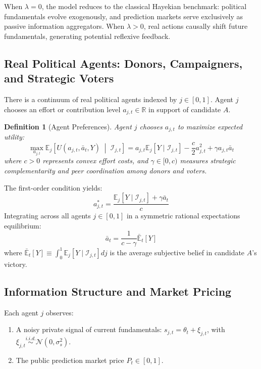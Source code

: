 \documentclass[12pt]{article}
\newtheorem{definition}{Definition}
\begin{document}
When $\lambda = 0$, the model reduces to the classical Hayekian benchmark: political fundamentals evolve exogenously, and prediction markets serve exclusively as passive information aggregators. When $\lambda > 0$, real actions causally shift future fundamentals, generating potential reflexive feedback.

\subsection{Real Political Agents: Donors, Campaigners, and Strategic Voters}
There is a continuum of real political agents indexed by $j \in [0, 1]$. Agent $j$ chooses an effort or contribution level $a_{j,t} \in \mathbb{R}$ in support of candidate $A$.

\begin{definition}[Agent Preferences]
Agent $j$ chooses $a_{j,t}$ to maximize expected utility:
\begin{equation}
\max_{a_{j,t}} \mathbb{E}_j \left[ U(a_{j,t}, \bar{a}_t, Y) \;\middle|\; \mathcal{I}_{j,t} \right] = a_{j,t} \mathbb{E}_j[Y \mid \mathcal{I}_{j,t}] - \frac{c}{2} a_{j,t}^2 + \gamma a_{j,t} \bar{a}_t
\end{equation}
where $c > 0$ represents convex effort costs, and $\gamma \in [0, c)$ measures strategic complementarity and peer coordination among donors and voters.
\end{definition}

The first-order condition yields:
\begin{equation}
a_{j,t}^* = \frac{\mathbb{E}_j[Y \mid \mathcal{I}_{j,t}] + \gamma \bar{a}_t}{c}
\end{equation}
Integrating across all agents $j \in [0, 1]$ in a symmetric rational expectations equilibrium:
\begin{equation}
\bar{a}_t = \frac{1}{c - \gamma} \bar{\mathbb{E}}_t[Y]
\end{equation}
where $\bar{\mathbb{E}}_t[Y] \equiv \int_0^1 \mathbb{E}_j[Y \mid \mathcal{I}_{j,t}] dj$ is the average subjective belief in candidate $A$'s victory.

\subsection{Information Structure and Market Pricing}
Each agent $j$ observes:
\begin{enumerate}
    \item A noisy private signal of current fundamentals: $s_{j,t} = \theta_t + \xi_{j,t}$, with $\xi_{j,t} \overset{i.i.d.}{\sim} \mathcal{N}(0, \sigma_s^2)$.
    \item The public prediction market price $P_t \in [0, 1]$.
\end{enumerate}
\end{document}
